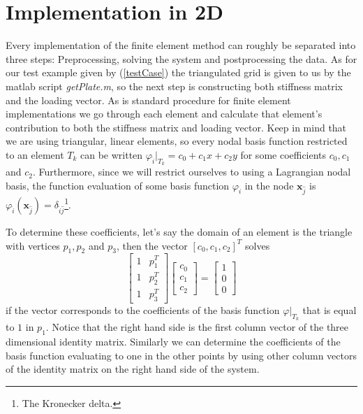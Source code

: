 \documentclass[paper=a4, fontsize=11pt]{scrartcl} %
\begin{document}
\section*{Implementation in 2D}
Every implementation of the finite element method can roughly be separated into three steps: Preprocessing, solving the system and postprocessing the data. As for our test example given by (\ref{testCase}) the triangulated grid is given to us by the matlab script \textit{getPlate.m}, so the next step is constructing both stiffness matrix and the loading vector. As is standard procedure for finite element implementations we go through each element and calculate that element's contribution to both the stiffness matrix and loading vector.  Keep in mind that we are using triangular, linear elements, so every nodal basis function restricted to an element $T_k$ can be written $\varphi_{\hat{i}}\big|_{T_k} = c_0 + c_1x+c_2y$ for some coefficients $c_0,c_1$ and $c_2$. Furthermore, since we will restrict ourselves to using a Lagrangian nodal basis, the function evaluation of some basis function $\varphi_{\hat{i}}$ in the node $\textbf{x}_{\hat{j}}$ is $\varphi_{\hat{i}}(\textbf{x}_{\hat{j}}) = \delta_{\hat{i}\hat{j}}$\footnote{The Kronecker delta.}.

To determine these coefficients, let's say the domain of an element is the triangle with vertices $p_1, p_2$ and $p_3$, then the vector $[c_0, c_1, c_2]^T$ solves
\begin{equation*}
\begin{bmatrix}
1 & p_1^T \\
1 & p_2^T \\
1 & p_3^T
\end{bmatrix}
\begin{bmatrix}
c_0 \\ c_1 \\ c_2
\end{bmatrix}
= \begin{bmatrix}
1 \\ 0 \\ 0
\end{bmatrix}
\end{equation*}
if the vector corresponds to the coefficients of the basis function $\varphi\big|_{T_k}$ that is equal to $1$ in $p_1$. Notice that the right hand side is the first column vector of the three dimensional identity matrix. Similarly we can determine the coefficients of the basis function evaluating to one in the other points by using other column vectors of the identity matrix on the right hand side of the system.
\end{document}
